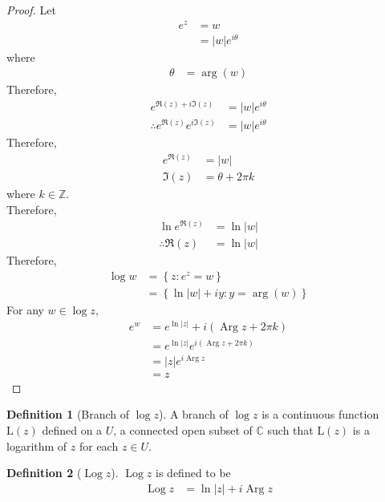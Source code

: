 \documentclass[titlepage, fleqn, a4paper, 12pt, twoside]{article}
\theoremstyle{definition}
\newtheorem{definition}{Definition}
\theoremstyle{theorem}
\DeclareMathOperator{\Arg}{Arg}
\DeclareMathOperator{\Log}{Log}
\begin{document}
\begin{proof}
	Let
	\begin{align*}
		e^z & = w \\
                    & = |w| e^{i \theta}
	\end{align*}
	where
	\begin{align*}
		\theta & = \arg(w)
	\end{align*}
	Therefore,
	\begin{align*}
		e^{\Re(z) + i \Im(z)}              & = |w| e^{i \theta} \\
		\therefore e^{\Re(z)} e^{i \Im(z)} & = |w| e^{i \theta}
	\end{align*}
	Therefore,
	\begin{align*}
		e^{\Re(z)} & = |w| \\
		\Im(z)     & = \theta + 2 \pi k
	\end{align*}
	where $k \in \mathbb{Z}$.\\
	Therefore,
	\begin{align*}
		\ln e^{\Re(z)}    & = \ln |w| \\
		\therefore \Re(z) & = \ln |w|
	\end{align*}
	Therefore,
	\begin{align*}
		\log w & = \left\{ z : e^z = w \right\} \\
                       & = \left\{ \ln |w| + i y : y = \arg(w) \right\}
	\end{align*}
	For any $w \in \log z$,
	\begin{align*}
		e^w & = e^{\ln |z|} + i \left( \Arg z + 2 \pi k \right)   \\
                    & = e^{\ln |z|} e^{i \left( \Arg z + 2 \pi k \right)} \\
                    & = |z| e^{i \Arg z}                                  \\
                    & = z
	\end{align*}
\end{proof}

\begin{definition}[Branch of $\log z$]
	A branch of $\log z$ is a continuous function $\mathrm{L}(z)$ defined on a $U$, a connected open subset of $\mathbb{C}$ such that $\mathrm{L}(z)$ is a logarithm of $z$ for each $z \in U$.
\end{definition}

\begin{definition}[$\Log z$]
	$\Log z$ is defined to be
	\begin{align*}
		\Log z & = \ln |z| + i \Arg z
	\end{align*}
\end{definition}
\end{document}
